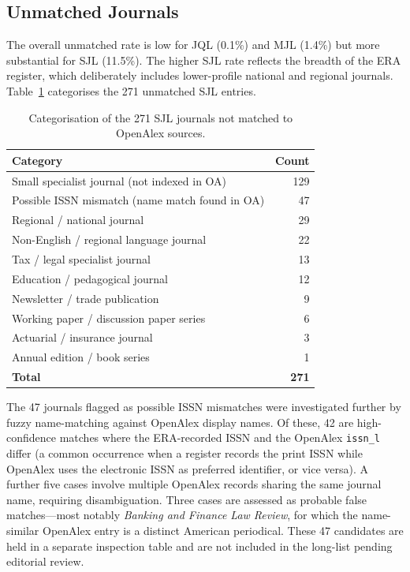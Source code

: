 \documentclass[10pt]{article}
\begin{document}
\subsection{Unmatched Journals}

The overall unmatched rate is low for JQL (0.1\%) and MJL (1.4\%) but more substantial for SJL (11.5\%).
The higher SJL rate reflects the breadth of the ERA register, which deliberately includes
lower-profile national and regional journals.
Table~\ref{tab:sjl_misses} categorises the 271 unmatched SJL entries.

\begin{table}[ht]
	\centering
	\caption{Categorisation of the 271 SJL journals not matched to OpenAlex sources.}
	\label{tab:sjl_misses}
	\small
	\begin{tabular}{lr}
		\toprule
		\textbf{Category} & \textbf{Count} \\
		\midrule
		Small specialist journal (not indexed in OA)   & 129 \\
		Possible ISSN mismatch (name match found in OA) &  47 \\
		Regional / national journal                    &  29 \\
		Non-English / regional language journal        &  22 \\
		Tax / legal specialist journal                 &  13 \\
		Education / pedagogical journal                &  12 \\
		Newsletter / trade publication                 &   9 \\
		Working paper / discussion paper series        &   6 \\
		Actuarial / insurance journal                  &   3 \\
		Annual edition / book series                   &   1 \\
		\midrule
		\textbf{Total}                                 & \textbf{271} \\
		\bottomrule
	\end{tabular}
\end{table}

The 47 journals flagged as possible ISSN mismatches were investigated further by
fuzzy name-matching against OpenAlex display names.
Of these, 42 are high-confidence matches where the ERA-recorded ISSN and the
OpenAlex \texttt{issn\_l} differ (a common occurrence when a register records the
print ISSN while OpenAlex uses the electronic ISSN as preferred identifier, or vice versa).
A further five cases involve multiple OpenAlex records sharing the same journal name,
requiring disambiguation.
Three cases are assessed as probable false matches---most notably
\textit{Banking and Finance Law Review}, for which the name-similar OpenAlex entry is
a distinct American periodical.
These 47 candidates are held in a separate inspection table and are not included
in the long-list pending editorial review.
\end{document}
